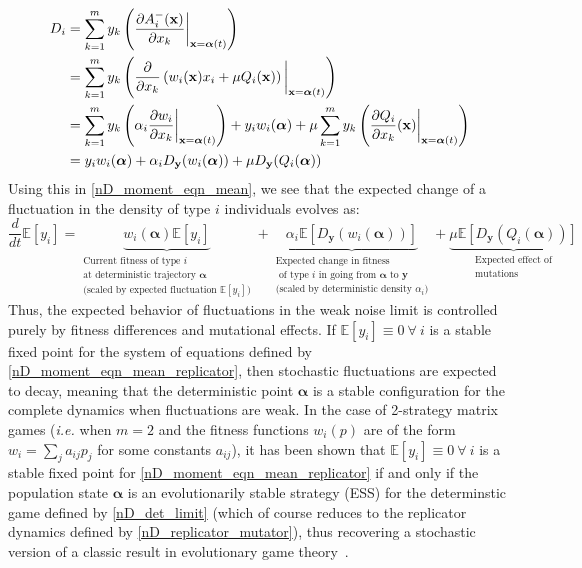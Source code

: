 \begin{align}
D_i &= \sum\limits_{k=1}^{m} y_k\left(\frac{\partial A^{-}_i(\mathbf{x})}{\partial x_k}\bigg{|}_{\mathbf{x}=\boldsymbol{\alpha}(t)}\right)\\
&= \sum\limits_{k=1}^{m} y_k\left(\frac{\partial}{\partial x_k}\left( w_i(\mathbf{x})x_i + \mu Q_i(\mathbf{x})\right)\bigg{|}_{\mathbf{x}=\boldsymbol{\alpha}(t)}\right)\\
&= \sum\limits_{k=1}^{m} y_k\left(\alpha_i\frac{\partial w_i}{\partial x_k}\bigg{|}_{\mathbf{x}=\boldsymbol{\alpha}(t)}\right) + y_iw_i(\boldsymbol{\alpha}) + \mu\sum\limits_{k=1}^{m} y_k\left(\frac{\partial Q_i}{\partial x_k}(\mathbf{x})\bigg{|}_{\mathbf{x}=\boldsymbol{\alpha}(t)}\right)\\
&= y_iw_i(\boldsymbol{\alpha}) + \alpha_iD_{\mathbf{y}}(w_i(\boldsymbol{\alpha})) + \mu D_{\mathbf{y}}(Q_i(\boldsymbol{\alpha}))\label{nD_WNA_directional_derivative_for_replicator_eqns}
\end{align}
Using this in \eqref{nD_moment_eqn_mean}, we see that the expected change of a fluctuation in the density of type $i$ individuals evolves as:
\begin{equation}
\label{nD_moment_eqn_mean_replicator}
\frac{d}{dt}\mathbb{E}[y_i] = \underbrace{w_i(\boldsymbol{\alpha})\mathbb{E}[y_i]}_{\substack{\text{Current fitness of type $i$} \\ \text{at deterministic trajectory $\boldsymbol{\alpha}$} \\ \text{(scaled by expected fluctuation $\mathbb{E}[y_i]$)}}} + \underbrace{\alpha_i\mathbb{E}[D_{\mathbf{y}}(w_i(\boldsymbol{\alpha}))]}_{\substack{\text{Expected change in fitness} \\ \text{ of type $i$ in going from $\boldsymbol{\alpha}$ to $\mathbf{y}$} \\ \text{(scaled by deterministic density $\alpha_i$)}}} + \underbrace{\mu\mathbb{E}[D_{\mathbf{y}}(Q_i(\boldsymbol{\alpha}))]}_{\substack{\text{Expected effect of} \\ \text{mutations}}}
\end{equation}
Thus, the expected behavior of fluctuations in the weak noise limit is controlled purely by fitness differences and mutational effects. If $\mathbb{E}[y_i] \equiv 0 \ \forall \ i$ is a stable fixed point for the system of equations defined by \eqref{nD_moment_eqn_mean_replicator}, then stochastic fluctuations are expected to decay, meaning that the deterministic point $\boldsymbol{\alpha}$ is a stable configuration for the complete dynamics when fluctuations are weak. In the case of 2-strategy matrix games (\emph{i.e.} when $m=2$ and the fitness functions $w_i(p)$ are of the form $w_i = \sum_j a_{ij}p_j$ for some constants $a_{ij}$), it has been shown that $\mathbb{E}[y_i] \equiv 0 \ \forall \ i$ is a stable fixed point for \eqref{nD_moment_eqn_mean_replicator} if and only if the population state $\boldsymbol{\alpha}$ is an evolutionarily stable strategy (ESS) for the determinstic game defined by \eqref{nD_det_limit} (which of course reduces to the replicator dynamics defined by \eqref{nD_replicator_mutator}), thus recovering a stochastic version of a classic result in evolutionary game theory~\citep{tao_stochastic_2007}.
